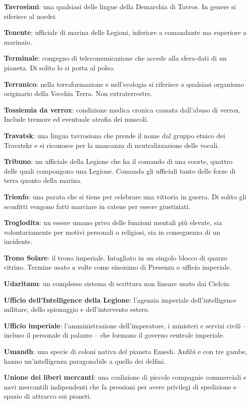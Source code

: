\textbf{Tavrosiani}: una qualsiasi delle lingue della Demarchia di
Tavros. In genere si riferisce al nordei.

\textbf{Tenente}: ufficiale di marina delle Legioni, inferiore a
comandante ma superiore a marinaio.

\textbf{Terminale}: congegno di telecomunicazione che accede alla
sfera-dati di un pianeta. Di solito lo si porta al polso.

\textbf{Terranico}: nella terraformazione e nell'ecologia si riferisce a
qualsiasi organismo originario della Vecchia Terra. Non extraterrestre.

\textbf{Tossiemia da verrox}: condizione medica cronica causata
dall'abuso di verrox. Include tremore ed eventuale atrofia dei muscoli.

\textbf{Travatsk}: una lingua tavrosiana che prende il nome dal gruppo
etnico dei Travatskr e si riconosce per la mancanza di neutralizzazione
delle vocali.

\textbf{Tribuno}: un ufficiale della Legione che ha il comando di una
coorte, quattro delle quali compongono una Legione. Comanda gli
ufficiali tanto delle forze di terra quanto della marina.

\textbf{Trionfo}: una parata che si tiene per celebrare una vittoria in
guerra. Di solito gli sconfitti vengono fatti marciare in catene per
essere giustiziati.

\textbf{Troglodita}: un essere umano privo delle funzioni mentali più
elevate, sia volontariamente per motivi personali o religiosi, sia in
conseguenza di un incidente.

\textbf{Trono Solare}: il trono imperiale. Intagliato in un singolo
blocco di quarzo citrino. Termine usato a volte come sinonimo di
Presenza o ufficio imperiale.

\textbf{Udaritanu}: un complesso sistema di scrittura non lineare usato
dai Cielcin.

\textbf{Ufficio dell'Intelligence della Legione}: l'agenzia imperiale
dell'intelligence militare, dello spionaggio e dell'intervento estero.

\textbf{Ufficio imperiale}: l'amministrazione dell'imperatore, i
ministeri e servizi civili -- incluso il personale di palazzo -- che
formano il governo centrale imperiale.

\textbf{Umandh}: una specie di coloni nativa del pianeta Emesh. Anfibi e
con tre gambe, hanno un'intelligenza paragonabile a quella dei delfini.

\textbf{Unione dei liberi mercanti}: una coalizione di piccole compagnie
commerciali e navi mercantili indipendenti che fa pressioni per avere
privilegi di spedizione e spazio di attracco sui pianeti.

